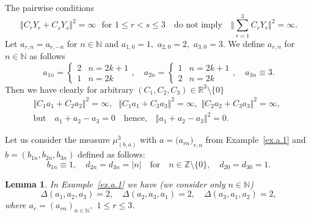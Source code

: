 \documentclass[preprint,12pt]{elsarticle}
\newcommand{\commA}[1]{\marginpar{%
\begin{color}{red}
\vskip-\baselineskip %
\raggedright\footnotesize
\itshape\hrule \smallskip A: #1\par\smallskip\hrule\end{color}}}
\newtheorem{lem}[thm]{Lemma}
\numberwithin{equation}{section}
\begin{document}
%
%
\begin{ex}
\label{ex.a.1}
The pairwise conditions 
$$\Vert C_rY_r +C_sY_s\Vert^2=\infty\,\,\text{ for} \,\,1\leq r<s\leq 3\quad \text{do not imply}
\quad \Vert \sum_{r=1}^3C_rY_r \Vert^2=\infty.
$$
%
Let $a_{r,n}=a_{r,-n}$ for $n\in\mathbb N$ and $a_{1,0}=1,\,\,a_{2,0}=2,\,\,a_{3,0}=3$. 
We define  $a_{r,n}$  for $n\in \mathbb N$ as follows  
\begin{equation}
\label{a_n.c-ex}
a_{1n}=  \left\{\begin{array}{ll}
 2&n=2k+1\\
 1&n=2k
\end{array}\right.,\quad
a_{2n}=  \left\{\begin{array}{ll}
 1&n=2k+1\\
 2&n=2k
\end{array}\right.,\quad a_{3n}\equiv 3.
\end{equation}
%
Then we have clearly for arbitrary $(C_1,C_2,C_3)\in \mathbb R^3\setminus\{0\}$
\begin{eqnarray}
 \label{pairwise}
&&
\Vert C_1a_1\!+\!C_2a_2\Vert^2\!=\!\infty,\,\,\,\,
\Vert C_1a_1\!+\!C_3a_3\Vert^2\!=\!\infty,\,\,\Vert C_2a_2\!+\!C_3a_3\Vert^2\!=\!\infty,\qquad
\\
\label{triple}
&&\text{but}\quad a_1+a_2-a_3=0\quad\text{hence,}\quad \Vert a_1 +a_2-a_3\Vert^2=0.
\end{eqnarray}
\end{ex}
%
%
\begin{ex}
\label{ex.(011)1.1}
Let us consider the measure $\mu^3_{{(b,a)}}$ with 
$a=\big(a_{rn}\big)_{r,n}$ from Example~\ref{ex.a.1} and  $b=(b_{1n},b_{2n},b_{3n})$ defined as follows: 
\begin{equation}
\label{(011)1.1}
b_{1n}\equiv 1, \quad
d_{2n}=d_{3n}=\vert n\vert
\quad\text{for}\quad 
n\in \mathbb Z\setminus \{0\},\quad d_{20}=d_{30}=1.
\end{equation}
\end{ex}
%
\begin{lem}
\label{l.a.1}
 In  Example~\ref{ex.a.1} we have {\rm (}we consider only $n\in \mathbb N${\rm )}
\begin{equation}
\label{=2}
\Delta(a_1,a_2,a_3)=2,\quad \Delta(a_2,a_3,a_1)=2,\quad\Delta(a_3,a_1,a_2)=2,
\end{equation}
where $a_r=(a_{rn})_{n\in \mathbb N},\,\,1\leq r\leq 3$.
\end{lem}
%
\end{document}
